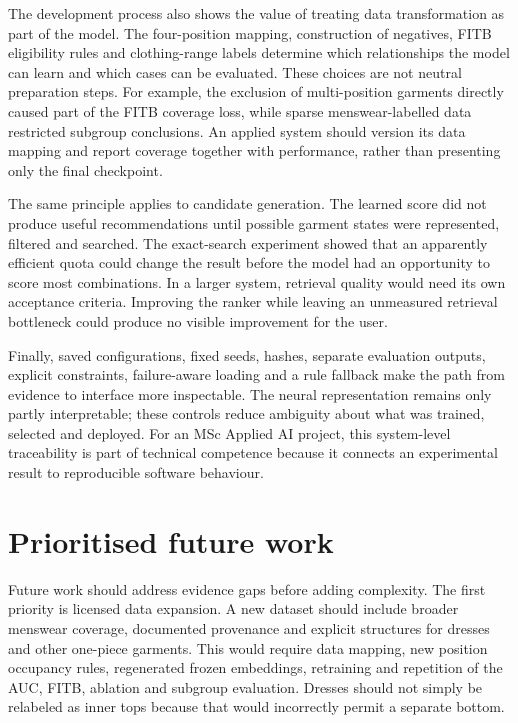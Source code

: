 The development process also shows the value of treating data transformation
as part of the model. The four-position mapping, construction of negatives,
FITB eligibility rules and clothing-range labels determine which relationships
the model can learn and which cases can be evaluated. These choices are not
neutral preparation steps. For example, the exclusion of multi-position
garments directly caused part of the FITB coverage loss, while sparse
menswear-labelled data restricted subgroup conclusions. An applied system
should version its data mapping and report coverage together with
performance, rather than presenting only the final checkpoint.

The same principle applies to candidate generation. The learned score did not
produce useful recommendations until possible garment states were represented,
filtered and searched. The exact-search experiment showed that an apparently
efficient quota could change the result before the model had an opportunity to
score most combinations. In a larger system, retrieval quality would
need its own acceptance criteria. Improving the ranker while leaving an
unmeasured retrieval bottleneck could produce no visible improvement for the
user.

Finally, saved configurations, fixed seeds, hashes, separate
evaluation outputs, explicit constraints, failure-aware loading and a rule
fallback make the path from evidence to interface more inspectable. The neural
representation remains only partly interpretable; these controls reduce
ambiguity about what was trained, selected and deployed. For an MSc Applied AI project,
this system-level traceability is part of technical competence because it
connects an experimental result to reproducible software behaviour.

\section{Prioritised future work}

Future work should address evidence gaps before adding complexity. The first
priority is licensed data expansion. A new dataset should include broader
menswear coverage, documented provenance and explicit structures for dresses
and other one-piece garments. This would require data mapping, new position
occupancy rules, regenerated frozen embeddings, retraining and repetition of
the AUC, FITB, ablation and subgroup evaluation. Dresses should not simply be
relabeled as inner tops because that would incorrectly permit a separate
bottom.

